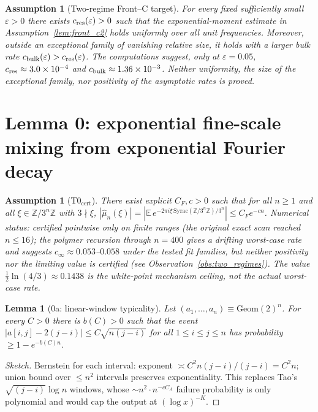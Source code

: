 \documentclass[12pt,a4paper]{article}
\newtheorem{lemma}[theorem]{Lemma}
\newtheorem{assumption}[theorem]{Assumption}
\begin{document}
\begin{assumption}[Two-regime Front--C target]
\label{ass:two_regime_front_c}
For every fixed sufficiently small $\varepsilon>0$ there exists
$c_{\rm res}(\varepsilon)>0$ such that the exponential-moment estimate in
Assumption~\ref{lem:front_c2} holds uniformly over all unit frequencies.
Moreover, outside an exceptional family of vanishing relative size, it holds
with a larger bulk rate $c_{\rm bulk}(\varepsilon)>c_{\rm res}(\varepsilon)$.
The computations suggest, only at $\varepsilon=0.05$,
$c_{\rm res}\approx3.0\times10^{-4}$ and
$c_{\rm bulk}\approx1.36\times10^{-3}$.  Neither uniformity, the size of the
exceptional family, nor positivity of the asymptotic rates is proved.
\end{assumption}

\section*{Lemma 0: exponential fine-scale mixing from exponential Fourier decay}

\begin{assumption}[T0$_{\mathrm{cert}}$]
There exist explicit $C_F,c>0$ such that for all $n\ge1$ and all
$\xi\in\mathbb Z/3^n\mathbb Z$ with $3\nmid\xi$,
$|\hat\mu_n(\xi)|=|\mathbb E\,e^{-2\pi i\xi\,\mathrm{Syrac}(\mathbb Z/3^n\mathbb Z)/3^n}|
\le C_Fe^{-cn}$.
Numerical status: certified pointwise only on finite ranges (the original exact
scan reached $n\le16$); the polymer recursion through $n=400$ gives a drifting
worst-case rate and suggests $c_\infty\approx0.053$--$0.058$ under the tested
fit families, but neither positivity nor the limiting value is certified (see
Observation~\ref{obs:two_regimes}).  The value
$\tfrac12\ln(4/3)\approx0.1438$ is the white-point mechanism ceiling, not the
actual worst-case rate.
\end{assumption}

\begin{lemma}[0a: linear-window typicality]
Let $(a_1,\dots,a_n)\equiv\mathrm{Geom}(2)^n$. For every $C>0$ there is
$b(C)>0$ such that the event
$|a[i,j]-2(j-i)|\le C\sqrt{n(j-i)}$ for all $1\le i\le j\le n$
has probability $\ge1-e^{-b(C)n}$.
\end{lemma}
\begin{proof}[Sketch] Bernstein for each interval: exponent
$\asymp C^2n(j-i)/(j-i)=C^2n$; union bound over $\le n^2$ intervals
preserves exponentiality. This replaces Tao's $\sqrt{(j-i)}\log n$ windows,
whose $\sim n^2\cdot n^{-cC_A}$ failure probability is only polynomial and
would cap the output at $(\log x)^{-K}$.
\end{proof}
\end{document}
